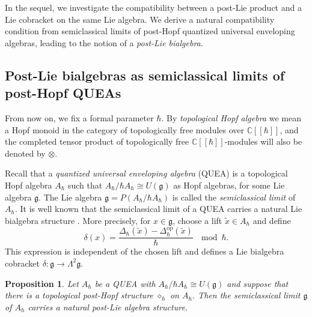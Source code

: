 \documentclass[11pt,english]{article}
\newcommand{\Del}{\Delta}
\newcommand{\act}{\mathbin{\diamond}}
\newtheorem{proposition}[lemma]{Proposition}
\theoremstyle{definition}
\begin{document}
In the sequel, we investigate the compatibility
between a post-Lie product and a Lie cobracket
on the same Lie algebra. We derive a natural
compatibility condition from semiclassical
limits of post-Hopf quantized universal
enveloping algebras, leading to the notion
of a \emph{post-Lie bialgebra}.

\subsection{Post-Lie bialgebras as semiclassical limits of post-Hopf QUEAs}
\label{subsec:semiclassical}

From now on, we fix a formal parameter $\hbar$. By \emph{topological Hopf algebra} we mean a Hopf monoid in the category of topologically free modules over $\mathbb{C}[[\hbar]]$, and the completed tensor
product of topologically free $\mathbb{C}[[\hbar]]$-modules will also be denoted by $\otimes$.

Recall that a \emph{quantized universal enveloping
algebra} (QUEA) is a topological Hopf algebra
$A_\hbar$ such that
$A_\hbar/\hbar A_\hbar\cong U(\mathfrak g)$
as Hopf algebras, for some Lie algebra
$\mathfrak g$. The Lie algebra $\mathfrak{g}= P(A_\hbar/\hbar A_\hbar)$ is called the \emph{semiclassical limit} of $A_\hbar$.
It is well known that the semiclassical limit of
a QUEA carries a natural Lie bialgebra structure
\cite{Drinfeld,ChariPressley}. More precisely,
for $x\in\mathfrak g$, choose a lift
$\widetilde{x}\in A_\hbar$ and define
\begin{equation}\label{eq:semiclassical-cobracket}
\delta(x)=
\frac{\Del_\hbar(\widetilde{x})
-\Del_\hbar^{\mathrm{op}}(\widetilde{x})}
{\hbar}  \ \mod \hbar.
\end{equation}
This expression is independent of the chosen lift
and defines a Lie bialgebra cobracket
$\delta:\mathfrak g\to\Lambda^2\mathfrak g$.

\begin{proposition}\label{prop:posthopf-limit}
Let $A_\hbar$ be a QUEA with $A_\hbar/\hbar A_\hbar\cong U(\mathfrak g)$ and suppose that there is a topological post-Hopf structure $\act_\hbar$ on $A_\hbar$. Then the semiclassical limit $\mathfrak g$ of 
$A_\hbar$ carries a natural post-Lie algebra
structure.
\end{proposition}
\end{document}
